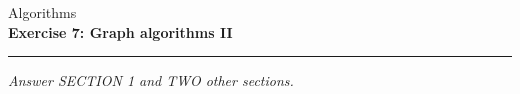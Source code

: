 \documentclass[10pt,a4paper]{exam}
\begin{document}
\begin{center}
\Large Algorithms \\
\LARGE \textbf{Exercise 7: Graph algorithms II} \\
\end{center}

\hrule

\vspace{0.5cm}


\begin{center}
\emph{Answer SECTION 1 and TWO other sections.}
\end{center}

\marksnotpoints
\pointsdroppedatright
\marksnotpoints
\marginpointname{ \points}
\end{document}
